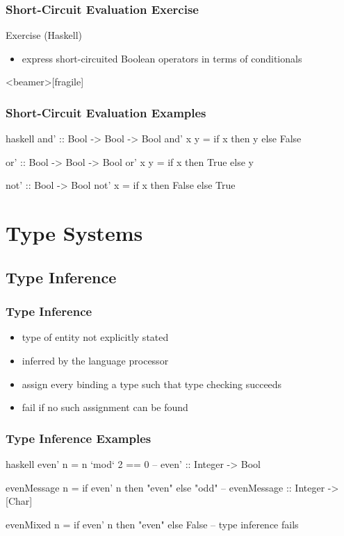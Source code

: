 \documentclass[dvipsnames]{beamer}
\theoremstyle{plain}
\begin{document}
\begin{frame}
  \frametitle{Short-Circuit Evaluation Exercise}

  \begin{block}{Exercise (Haskell)}
    \begin{itemize}
      \item express short-circuited Boolean operators in terms of conditionals
    \end{itemize}
  \end{block}
\end{frame}

\begin{frame}<beamer>[fragile]
  \frametitle{Short-Circuit Evaluation Examples}

  \begin{example}[Haskell]
    \begin{pygments}{haskell}
and' :: Bool -> Bool -> Bool
and' x y = if x then y else False

or' :: Bool -> Bool -> Bool
or' x y = if x then True else y

not' :: Bool -> Bool
not' x = if x then False else True
    \end{pygments}
  \end{example}
\end{frame}

\section{Type Systems}

\subsection{Type Inference}

\begin{frame}
  \frametitle{Type Inference}

  \begin{itemize}
    \item type of entity not explicitly stated
    \item inferred by the language processor

    \pause
    \medskip
    \item assign every binding a type such that type checking succeeds
    \item fail if no such assignment can be found
  \end{itemize}
\end{frame}

\begin{frame}[fragile]
  \frametitle{Type Inference Examples}

  \begin{example}[Haskell]
    \begin{pygments}{haskell}
even' n = n `mod` 2 == 0
-- even' :: Integer -> Bool

evenMessage n = if even' n then "even" else "odd"
-- evenMessage :: Integer -> [Char]

evenMixed n = if even' n then "even" else False
-- type inference fails
    \end{pygments}
  \end{example}
\end{frame}
\end{document}
